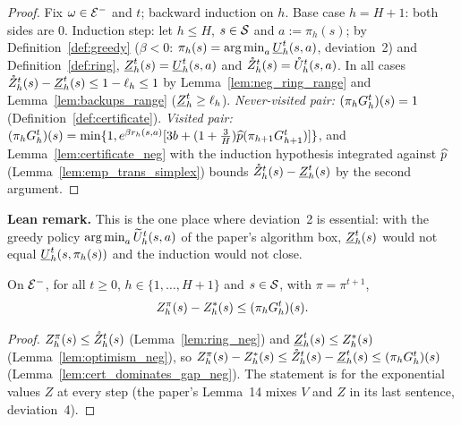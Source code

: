 \begin{proof}
\leanok
Fix $\omega \in \mathcal{E}^-$ and $t$; backward induction on $h$. Base case $h = H + 1$: both sides are $0$.
Induction step: let $h \le H$, $s \in \mathcal{S}$ and $a := \pi_h(s)$; by Definition~\ref{def:greedy} ($\beta < 0$:
$\pi_h(s) = \operatorname*{arg\,min}_a\underline{U}_h^t(s,a)$, deviation~2) and Definition~\ref{def:ring},
$\underline{Z}_h^t(s) = \underline{U}_h^t(s,a)$ and $\mathring{Z}_h^t(s) = \mathring{U}_h^t(s,a)$. In all cases
$\mathring{Z}_h^t(s) - \underline{Z}_h^t(s) \le 1 - \ell_h \le 1$ by Lemma~\ref{lem:neg_ring_range} and
Lemma~\ref{lem:backups_range} ($\underline{Z}_h^t \ge \ell_h$). \emph{Never-visited pair:} $(\pi_hG_h^t)(s) = 1$
(Definition~\ref{def:certificate}). \emph{Visited pair:}
$(\pi_hG_h^t)(s) = \min\{1, e^{\beta r_h(s,a)}[3b + (1 + \frac3H)\widehat{p}(\pi_{h+1}G^t_{h+1})]\}$, and
Lemma~\ref{lem:certificate_neg} with the induction hypothesis integrated against $\widehat{p}$
(Lemma~\ref{lem:emp_trans_simplex}) bounds $\mathring{Z}_h^t(s) - \underline{Z}_h^t(s)$ by the second argument.
\end{proof}

\textbf{Lean remark.} This is the one place where deviation~2 is essential: with the greedy
policy $\operatorname*{arg\,min}_a\widetilde{U}^t_h(s,a)$ of the paper's algorithm box, $\underline{Z}_h^t(s)$ would not equal
$\underline{U}_h^t(s, \pi_h(s))$ and the induction would not close.

\begin{lemma}\label{lem:stopping_neg}
\leanok
{}
On $\mathcal{E}^-$, for all $t \ge 0$, $h \in \{1, \dots, H + 1\}$ and $s \in \mathcal{S}$, with $\pi = \pi^{t+1}$,
\[
  Z^\pi_h(s) - Z^*_h(s) \le (\pi_hG_h^t)(s) .
\]
\end{lemma}

\begin{proof}
\leanok
$Z^\pi_h(s) \le \mathring{Z}_h^t(s)$ (Lemma~\ref{lem:ring_neg}) and $\underline{Z}_h^t(s) \le Z^*_h(s)$
(Lemma~\ref{lem:optimism_neg}), so $Z^\pi_h(s) - Z^*_h(s) \le \mathring{Z}_h^t(s) - \underline{Z}_h^t(s) \le (\pi_hG_h^t)(s)$
(Lemma~\ref{lem:cert_dominates_gap_neg}). The statement is for the exponential values $Z$ at every
step (the paper's Lemma~14 mixes $V$ and $Z$ in its last sentence, deviation~4).
\end{proof}


